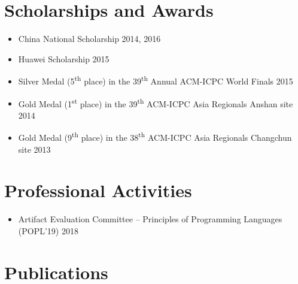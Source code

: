 \documentclass[11pt,letterpaper,sans]{moderncv}        %
\makeatletter
\renewcommand*{\bibliographyitemlabel}{\@biblabel{\arabic{enumiv}}}
\makeatother
\begin{document}
\section{Scholarships and Awards}

\begin{itemize}
\item China National Scholarship \hfill 2014, 2016
\item Huawei Scholarship \hfill 2015

	\vspace{4pt}

	\item Silver Medal (5\textsuperscript{th} place) in the 39\textsuperscript{th} Annual ACM-ICPC World Finals \hfill 2015
	\item Gold Medal (1\textsuperscript{st} place) in the 39\textsuperscript{th} ACM-ICPC Asia Regionals Anshan site \hfill 2014
	\item Gold Medal (9\textsuperscript{th} place) in the 38\textsuperscript{th} ACM-ICPC Asia Regionals Changchun site \hfill 2013
\end{itemize}


\section{Professional Activities}

\begin{itemize}
	\item Artifact Evaluation Committee -- Principles of Programming Languages (POPL'19) \hfill 2018
\end{itemize}

%

\section{Publications}
\vspace{2pt}
\vspace{2pt}
\end{document}
